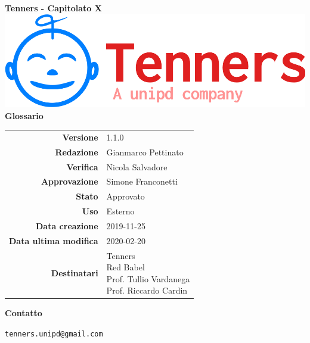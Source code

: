 \begin{titlepage}
	\begin{center}
		\large \textbf{Tenners - Capitolato X}
		\vfill
		\includegraphics[scale = 0.3]{./res/img/logo.png}\\
		\vfill
		\Huge \textbf{Glossario}

        \vfill
        \large

        \begin{tabular}{r|l}
                        \textbf{Versione} & 1.1.0 \\
                        \textbf{Redazione} &
                        Gianmarco Pettinato\\
                        \textbf{Verifica} &
                        Nicola Salvadore \\
                        \textbf{Approvazione} & Simone Franconetti \\
                        \textbf{Stato} & Approvato \\
                        \textbf{Uso} &  Esterno\\
                        \textbf{Data creazione} &  2019-11-25\\
                        \textbf{Data ultima modifica} & 2020-02-20 \\
                        \textbf{Destinatari} & \parbox[t]{5cm}{Tenners \\ Red Babel \\ Prof. Tullio Vardanega\\Prof. Riccardo Cardin}
                \end{tabular}
                \vfill
                \normalsize
                \vfill
                \textbf{Contatto}

                \texttt{tenners.unipd@gmail.com}

	\end{center}
\end{titlepage}
